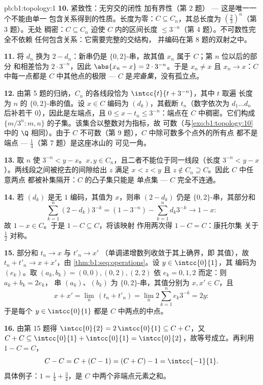 \begin{solution}{pb:b1:topology:1}
\textbf{10.} 紧致性：无穷交的闭性
加有界性（第 2 题） --- 这是唯一一个不能由单一
包含关系得到的性质。长度为零：$C \subseteq
C_n$，其总长度为 $(\frac23)^n$（第 3 题）。无处
稠密：$C \subseteq C_n$ 迫使 $C$ 内的区间长度
$\leq 3^{-n}$（第 4 题）。不可数性完全不依赖
任何包含关系：它需要完整的交结构，
并编码在第 8 题的双射之中。

\textbf{11.} 将 $d_n$ 换为 $2 - d_n$：新串仍是
$\{0,2\}$-串，故其值 $x_n$ 属于 $C$；第 $n$ 位以后的部分
和相差恰为 $2\cdot3^{-n}$，因此
$\abs{x_n - x} = 2\cdot3^{-n}$。于是 $x_n \neq x$ 且 $x_n \to
x$：$C$ 中每一点都是 $C$ 中其他点的极限 --- $C$
是\emph{完备集}，没有孤立点。

\textbf{12.} 由第 5 题的归纳，$C_n$ 的各线段恰为
$\intcc{t}{t + 3^{-n}}$，其中 $t$ 取遍
长度为 $n$ 的 $\{0,2\}$-串的值。设 $x \in C$
编码为 $(d_k)$，其截断 $t_n$（数字依次为 $d_1 \dots d_n$
后补若干 $0$），因此是左端点，且 $0 \leq x - t_n
\leq 3^{-n}$：端点在 $C$ 中稠密。它们构成
$\{m/3^n : m, n\}$ 的子集。该集合以整数对为指标，故
可数（与\cref{exo:b1:topology:10}中的 $\Q$ 相同）。由于 $C$
不可数（第 9 题），$C$ 中除可数多个点外的所有点
都不是端点 --- $\frac14$（第 7 题）是这座冰山的
可见一角。

\textbf{13.} 取 $n$ 使 $3^{-n} < y - x$。$x, y \in
C_n$，且二者不能位于同一线段（长度 $3^{-n} <
y - x$）。两线段之间被挖去的间隙给出 $z$
满足 $x < z < y$ 且 $z \notin C_n \supseteq C$。因此 $C$ 中任意两点
都被补集隔开：$C$ 的凸子集只能是
单点集 --- $C$ 完全不连通。

\textbf{14.} 若 $(d_k)$ 是无 $1$ 编码，其值为 $x$，则串
$(2 - d_k)$ 仍是 $\{0,2\}$-串，其部分和
\[
\sum_{k=1}^{n} (2 - d_k)3^{-k} = (1 - 3^{-n}) - \sum_{k=1}^n
d_k 3^{-k} \longrightarrow 1 - x :
\]
故 $1 - x \in C$。于是 $1 - C \subseteq C$，将该映射
作用两次得 $1 - C = C$：康托尔集
关于 $\frac12$ 对称。

\textbf{15.} 部分和 $t_n \to x$ 与 $t'_n \to x'$
（单调递增数列收敛于其上确界，即
其值），故 $t_n + t'_n \to x + x'$，由
\cref{thm:b1:seq:operations}。设 $y \in \intcc{0}{1}$，其
编码为 $(e_k)$。取 $(a_k, b_k) = (0,0), (0,2), (2,2)$
依 $e_k = 0, 1, 2$ 而定：则 $a_k + b_k = 2e_k$，
串 $(a_k)$、$(b_k)$ 为 $\{0,2\}$-串，其值分别为 $x,
x' \in C$，且
\[
x + x' = \lim_n\,(t_n + t'_n) = \lim_n 2\sum_{k=1}^n e_k 3^{-k}
= 2y :
\]
于是每个 $y \in \intcc{0}{1}$ 都是 $C$ 中两点的中点。

\textbf{16.} 由第 15 题得 $\intcc{0}{2} = 2\,\intcc{0}{1}
\subseteq C + C$，又 $C + C \subseteq \intcc{0}{1} +
\intcc{0}{1} = \intcc{0}{2}$，故等号成立。再利用 $1 - C = C$，
\[
C - C = C + (C - 1) = (C + C) - 1 = \intcc{-1}{1} .
\]
具体例子：$1 = \frac14 + \frac34$，是
$C$ 中两个非端点元素之和。


\end{solution}
